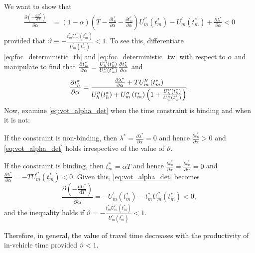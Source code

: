 \documentclass[12pt,a4paper,british]{article}
\makeatletter
\newenvironment{proof}[1][\proofname]{\par
    \normalfont\topsep6\p@\@plus6\p@\relax
    \trivlist
    \itemindent\parindent
    \item[\hskip\labelsep
          \scshape
      #1]\ignorespaces
  }{%
    \endtrivlist\@endpefalse
  }
\providecommand{\proofname}{Proof}
\makeatother
\begin{document}
\begin{proof}
We want to show that
\begin{align}
\frac{\partial\left(-\frac{\mathrm{d}U^{\ast}}{\mathrm{d}T}\right)}{\partial\alpha} & =\left(1-\alpha\right)\left(T-\frac{\partial t_{h}^{\ast}}{\partial\alpha} - \frac{\partial t_{w}^{\ast}}{\partial\alpha}\right)U_{m}^{\prime\prime}\left(t_{m}^{\ast}\right)-U_{m}^{\prime}\left(t_{m}^{\ast}\right)+\frac{\partial\lambda^{\ast}}{\partial\alpha} < 0
\label{eq:vot_alpha_det}
\end{align}
provided that $\vartheta\equiv-\frac{t_{m}^{\ast}U_{m}^{\prime\prime}\left(t_{m}^{\ast}\right)}{U_{m}^{\prime}\left(t_{m}^{\ast}\right)}<1$. To see this, differentiate \eqref{eq:foc_deterministic_th} and \eqref{eq:foc_deterministic_tw} with respect to $\alpha$ and manipulate to find that $\frac{\partial t_{w}^{\ast}}{\partial\alpha} = \frac{U_{h}^{\prime\prime} \text{\ensuremath{\left(t_{h}^{\ast}\right)}}}{U_{w}^{\prime\prime}\text{\ensuremath{\left(t_{w}^{\ast}\right)}}}\frac{\partial t_{h}^{\ast}}{\text{\ensuremath{\partial\alpha}}}$ and%
\begin{equation*}
\frac{\partial t_{h}^{\ast}}{\partial\alpha}=\frac{\frac{\partial\lambda^{\ast}}{\partial\alpha}+TU_{m}^{\prime\prime}\left(t_{m}^{\ast}\right)}{U_{h}^{\prime\prime}\text{\ensuremath{\left(t_{h}^{\ast}\right)}}+U_{m}^{\prime\prime}\left(t_{m}^{\ast}\right)\left(1+\frac{U_{h}^{\prime\prime}\text{\ensuremath{\left(t_{h}^{\ast}\right)}}}{U_{w}^{\prime\prime}\text{\ensuremath{\left(t_{w}^{\ast}\right)}}}\right)}.
\end{equation*}
Now, examine \eqref{eq:vot_alpha_det} when the time constraint is binding and when it is not:
\begin{casenv}
\item If the constraint is non-binding, then $\lambda^{\ast} = \frac{\partial\lambda^{\ast}}{\partial\alpha} = 0$ and hence $\frac{\partial t_{h}^{\ast}}{\partial\alpha}>0$ and \eqref{eq:vot_alpha_det} holds irrespective of the value of $\vartheta$.
\item If the constraint is binding, then $t_{m}^{\ast}=\alpha T$ and hence $\frac{\partial t_{h}^{\ast}}{\partial\alpha}=\frac{\partial t_{w}^{\ast}}{\partial\alpha}=0$ and $\frac{\partial\lambda^{\ast}}{\partial\alpha}=-TU_{m}^{\prime\prime}\left(t_{m}^{\ast}\right)<0$. Given this, \eqref{eq:vot_alpha_det} becomes%
\begin{equation*}
\frac{\partial\left(-\frac{\mathrm{d}U^{\ast}}{\mathrm{d}T}\right)}{\partial\alpha}=-U_{m}^{\prime}\left(t_{m}^{\ast}\right)-t_{m}^{\ast}U_{m}^{\prime\prime}\left(t_{m}^{\ast}\right) < 0,
\end{equation*}
and the inequality holds if $\vartheta=-\frac{t_{m}^{\ast}U_{m}^{\prime\prime}\left(t_{m}^{\ast}\right)}{U_{m}^{\prime}\left(t_{m}^{\ast}\right)}<1$.
\end{casenv}
Therefore, in general, the value of travel time decreases with the productivity of in-vehicle time provided $\vartheta<1$.
\end{proof}
\end{document}
